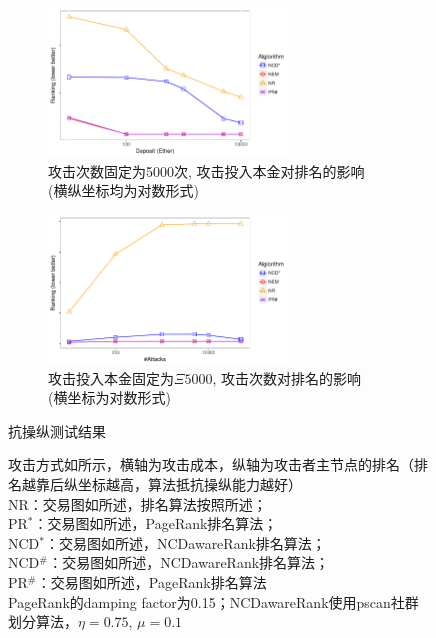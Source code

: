 \begin{figure}[!ht]
	\centering
	\begin{subfigure}{\linewidth}
		\centering
		\includegraphics[width=0.7\textwidth]{figs/AttackDeposit.pdf}
		\caption{攻击次数固定为5000次, 攻击投入本金对排名的影响 \\ \footnotesize{(横纵坐标均为对数形式)}}
		\label{subfig:deposit}
	\end{subfigure}

	\begin{subfigure}{\linewidth}
	    \centering
		\includegraphics[width=0.7\textwidth]{figs/AttackTimes.pdf}
		\caption{攻击投入本金固定为$\Xi5000$, 攻击次数对排名的影响  \\ \footnotesize{(横坐标为对数形式)}}\label{subfig:times}
	\end{subfigure}

	\caption{抗操纵测试结果} \label{fig:antiManipulation}
	\caption*{\footnotesize{攻击方式如所示，横轴为攻击成本，纵轴为攻击者主节点的排名（排名越靠后纵坐标越高，算法抵抗操纵能力越好） \\
	NR：交易图如所述，排名算法按照所述；\\PR$^*$：交易图如所述，PageRank排名算法；\\ NCD$^*$：交易图如所述，NCDawareRank排名算法；\\ NCD$^{\#}$：交易图如\cite{nem}所述，NCDawareRank排名算法；\\ PR$^{\#}$：交易图如\cite{nem}所述，PageRank排名算法 \\ PageRank的damping factor为0.15；NCDawareRank使用pscan\cite{chang2017mathsf}社群划分算法，$\eta=0.75$, $\mu=0.1$}}
\end{figure}

